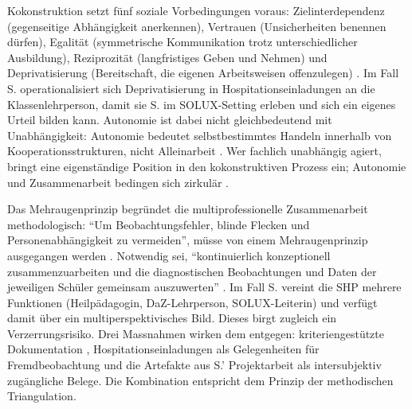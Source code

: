 \documentclass[ngerman, a4paper]{article}
\begin{document}
Kokonstruktion setzt fünf soziale Vorbedingungen voraus: Zielinterdependenz
(gegenseitige Abhängigkeit anerkennen), Vertrauen (Unsicherheiten benennen dürfen),
Egalität (symmetrische Kommunikation trotz unterschiedlicher Ausbildung),
Reziprozität (langfristiges Geben und Nehmen) und Deprivatisierung (Bereitschaft,
die eigenen Arbeitsweisen offenzulegen)
\parencite[vgl.][S.\,469--471]{groschefussangelgraesel2020kokonstruktion}.
Im Fall S. operationalisiert sich Deprivatisierung in
Hospitationseinladungen an die Klassenlehrperson, damit sie S. im SOLUX-Setting
erleben und sich ein eigenes Urteil bilden kann. Autonomie ist dabei nicht
gleichbedeutend mit Unabhängigkeit: Autonomie bedeutet selbstbestimmtes Handeln
innerhalb von Kooperationsstrukturen, nicht Alleinarbeit
\parencite[vgl.][S.\,469]{groschefussangelgraesel2020kokonstruktion}.
Wer fachlich unabhängig agiert, bringt eine eigenständige Position in den
kokonstruktiven Prozess ein; Autonomie und Zusammenarbeit bedingen sich zirkulär
\parencite[vgl.][S.\,302\psq]{widmerwolf2018multiprofessionell}.

Das Mehraugenprinzip begründet die multiprofessionelle Zusammenarbeit
methodologisch: \enquote{Um Beobachtungsfehler, blinde Flecken und
  Personenabhängigkeit zu vermeiden}, müsse von einem Mehraugenprinzip ausgegangen
werden \parencite[S.\,228]{muelleroppliger2021paeddiagnostik}. Notwendig sei,
\enquote{kontinuierlich konzeptionell zusammenzuarbeiten und die diagnostischen
  Beobachtungen und Daten der jeweiligen Schüler gemeinsam auszuwerten}
\parencite[S.\,355]{nguyensliwka2021massnahmen}. Im Fall S. vereint die SHP
mehrere Funktionen (Heilpädagogin, DaZ-Lehrperson, SOLUX-Leiterin) und verfügt
damit über ein multiperspektivisches Bild. Dieses birgt zugleich ein
Verzerrungsrisiko. Drei Massnahmen wirken dem entgegen: kriteriengestützte
Dokumentation \parencite[vgl.][S.\,228\psq]{muelleroppliger2021paeddiagnostik},
Hospitationseinladungen als Gelegenheiten für Fremdbeobachtung und die Artefakte
aus S.' Projektarbeit als intersubjektiv zugängliche Belege. Die Kombination
entspricht dem Prinzip der methodischen Triangulation.
\end{document}
